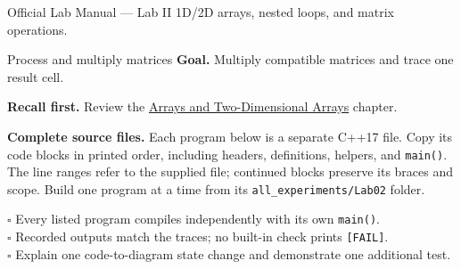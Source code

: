 
\begin{sourcealignment}{Official Lab Manual --- Lab II}
1D/2D arrays, nested loops, and matrix operations.
\end{sourcealignment}

\begin{labproject}{Process and multiply matrices}
\textbf{Goal.} Multiply compatible matrices and trace one result cell.

\textbf{Recall first.} Review the \hyperref[ch:arrays]{Arrays and Two-Dimensional Arrays} chapter.

\textbf{Complete source files.} Each program below is a separate C++17 file.
Copy its code blocks in printed order, including headers, definitions, helpers, and \texttt{main()}.
The line ranges refer to the supplied file; continued blocks preserve its braces and scope.
Build one program at a time from its \texttt{all\_experiments/Lab02} folder.



\tcbbreak

\end{labproject}

\begin{verification}
$\square$ Every listed program compiles independently with its own \texttt{main()}.\\
$\square$ Recorded outputs match the traces; no built-in check prints \texttt{[FAIL]}.\\
$\square$ Explain one code-to-diagram state change and demonstrate one additional test.
\end{verification}
